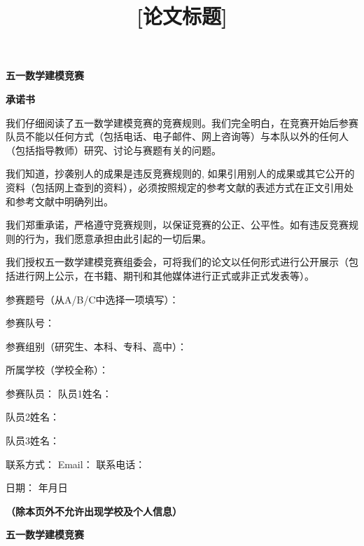 \documentclass[withoutpreface,bwprint]{cumcmthesis}
\title{[论文标题]}
\begin{document}
\noindent
\noindent
\noindent
\noindent
\begin{center}
{\huge \textbf{五一数学建模竞赛}}
\end{center}
\begin{center}
{\LARGE \textbf{承\quad 诺\quad 书}}
\end{center}

我们仔细阅读了五一数学建模竞赛的竞赛规则。我们完全明白，在竞赛开始后参赛队员不能以任何方式（包括电话、电子邮件、网上咨询等）与本队以外的任何人（包括指导教师）研究、讨论与赛题有关的问题。

我们知道，抄袭别人的成果是违反竞赛规则的, 如果引用别人的成果或其它公开的资料（包括网上查到的资料），必须按照规定的参考文献的表述方式在正文引用处和参考文献中明确列出。

我们郑重承诺，严格遵守竞赛规则，以保证竞赛的公正、公平性。如有违反竞赛规则的行为，我们愿意承担由此引起的一切后果。

我们授权五一数学建模竞赛组委会，可将我们的论文以任何形式进行公开展示（包括进行网上公示，在书籍、期刊和其他媒体进行正式或非正式发表等）。

参赛题号（从A/B/C中选择一项填写）：\underbar{\qquad\qquad\qquad\qquad\qquad\qquad\qquad\qquad\qquad}

参赛队号：\underbar{\qquad\qquad\qquad\qquad\qquad\qquad\qquad\qquad\qquad\qquad\qquad\qquad\qquad\qquad\qquad}

参赛组别（研究生、本科、专科、高中）：\underbar{\qquad\qquad\qquad\qquad\qquad\qquad\qquad\qquad\qquad}

所属学校（学校全称）：\underbar{\qquad\qquad\qquad\qquad\qquad\qquad\qquad\qquad\qquad}

参赛队员：
 队员1姓名：\underbar{\qquad\qquad\qquad\qquad\qquad\qquad\qquad\qquad\qquad}

\qquad\qquad\quad 队员2姓名：\underbar{\qquad\qquad\qquad\qquad\qquad\qquad\qquad\qquad\qquad}

\qquad\qquad\quad 队员3姓名：\underbar{\qquad\qquad\qquad\qquad\qquad\qquad\qquad\qquad\qquad}

联系方式：
 Email：\underbar{\qquad\qquad\qquad\qquad} 联系电话：\underbar{\qquad\qquad\qquad\qquad}

\hfill 日期： \underbar{\qquad}年\underbar{\qquad}月\underbar{\qquad}日

\noindent
\noindent \underbar{}
\noindent \textbf{}
\noindent \textbf{}
\noindent \hfill \textbf{（除本页外不允许出现学校及个人信息）\eject }

\noindent
\begin{center}
{\huge \textbf{五一数学建模竞赛}}
\end{center}
\end{document}
